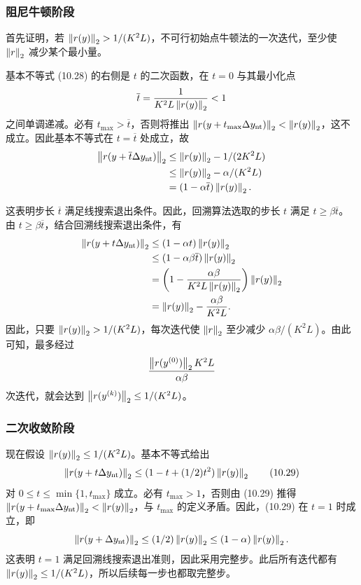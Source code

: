 \subsubsection*{阻尼牛顿阶段}
首先证明，若 $\left\lVert r(y)\right\rVert_2>1/(K^2L)$，不可行初始点牛顿法的一次迭代，至少使 $\left\lVert r\right\rVert_2$ 减少某个最小量。

基本不等式 (10.28) 的右侧是 $t$ 的二次函数，在 $t=0$ 与其最小化点
\[\overline t=\frac1{K^2L\left\lVert r(y)\right\rVert_2}<1\]
之间单调递减。必有 $t_{\max}>\overline t$，否则将推出 $\left\lVert r(y+t_{\max}\Delta y_{\rm nt})\right\rVert_2<\left\lVert r(y)\right\rVert_2$，这不成立。因此基本不等式在 $t=\overline t$ 处成立，故
\[\begin{aligned}
\left\lVert r(y+\overline t\Delta y_{\rm nt})\right\rVert_2&\le\left\lVert r(y)\right\rVert_2-1/(2K^2L)\\
&\le\left\lVert r(y)\right\rVert_2-\alpha/(K^2L)\\
&=(1-\alpha\overline t)\left\lVert r(y)\right\rVert_2.
\end{aligned}\]

这表明步长 $\overline t$ 满足线搜索退出条件。因此，回溯算法选取的步长 $t$ 满足 $t\ge\beta\overline t$。由 $t\ge\beta\overline t$，结合回溯线搜索退出条件，有
\[\begin{aligned}
\left\lVert r(y+t\Delta y_{\rm nt})\right\rVert_2&\le(1-\alpha t)\left\lVert r(y)\right\rVert_2\\
&\le(1-\alpha\beta\overline t)\left\lVert r(y)\right\rVert_2\\
&=\left(1-\frac{\alpha\beta}{K^2L\left\lVert r(y)\right\rVert_2}\right)\left\lVert r(y)\right\rVert_2\\
&=\left\lVert r(y)\right\rVert_2-\frac{\alpha\beta}{K^2L}.
\end{aligned}\]
因此，只要 $\left\lVert r(y)\right\rVert_2>1/(K^2L)$，每次迭代使 $\left\lVert r\right\rVert_2$ 至少减少 $\alpha\beta/(K^2L)$。由此可知，最多经过
\[\frac{\left\lVert r(y^{(0)})\right\rVert_2K^2L}{\alpha\beta}\]
次迭代，就会达到 $\left\lVert r(y^{(k)})\right\rVert_2\le1/(K^2L)$。

\subsubsection*{二次收敛阶段}
现在假设 $\left\lVert r(y)\right\rVert_2\le1/(K^2L)$。基本不等式给出
\begin{equation}\left\lVert r(y+t\Delta y_{\rm nt})\right\rVert_2\le(1-t+(1/2)t^2)\left\lVert r(y)\right\rVert_2\tag{10.29}\end{equation}
对 $0\le t\le\min\{1,t_{\max}\}$ 成立。必有 $t_{\max}>1$，否则由 (10.29) 推得 $\left\lVert r(y+t_{\max}\Delta y_{\rm nt})\right\rVert_2<\left\lVert r(y)\right\rVert_2$，与 $t_{\max}$ 的定义矛盾。因此，(10.29) 在 $t=1$ 时成立，即
\[\left\lVert r(y+\Delta y_{\rm nt})\right\rVert_2\le(1/2)\left\lVert r(y)\right\rVert_2\le(1-\alpha)\left\lVert r(y)\right\rVert_2.\]
这表明 $t=1$ 满足回溯线搜索退出准则，因此采用完整步。此后所有迭代都有 $\left\lVert r(y)\right\rVert_2\le1/(K^2L)$，所以后续每一步也都取完整步。

